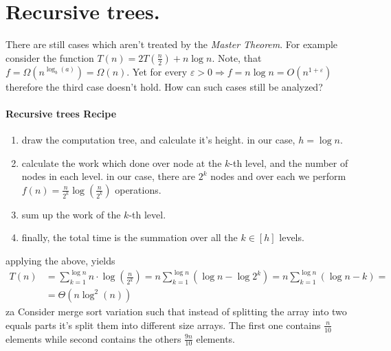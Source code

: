 \section{Recursive trees.}
There are still cases which aren't treated by the \textit{Master Theorem}. For example consider the function \(T\left(n\right) = 2T\left(\frac{n}{2}\right) + n\log n \). Note, that \(f = \Omega\left( n^{\log_{b}(a)} \right) = \Omega\left(n\right)\). Yet for every \( \varepsilon > 0 \Rightarrow f = n\log n = O\left( n^{1+\varepsilon} \right) \) therefore the third case  doesn't hold. How can such cases still be analyzed? 

\paragraph{Recursive trees Recipe}
    \begin{enumerate}
        \item draw the computation tree, and calculate it's height. in our case, \( h = \log n \).
        \item calculate the work which done over node at the \(k\)-th level, and the number of nodes in each level. in our case, there are \(2^k\) nodes and over each we perform \(f(n) = \frac{n}{2^k} \log\left( \frac{n}{2^k}\right)\) operations. 
        \item sum up the work of the \(k\)-th level.
        \item finally, the total time is the summation over all the \( k \in [h]\) levels. 
    \end{enumerate}
applying the above, yields 
\begin{equation*} 
\begin{split} 
T\left(n\right) & =  \sum_{k=1}^{\log{n}}{n\cdot\log \left( \frac{n}{2^k}\right)} = n\sum_{k=1}^{\log{n}}{ \left( \log n - \log 2^k \right) } 
  = n\sum_{k=1}^{\log{n}}{ \left( \log n - k \right) } = \\ & = \Theta \left( n \log^2 \left(n\right)  \right) 
\end{split}
\end{equation*}
za
 Consider merge sort variation such that instead of splitting the array into two equals parts it's split them into different size arrays. The first one contains \( \frac{n}{10} \) elements while second contains the others \( \frac{9n}{10}\) elements.

